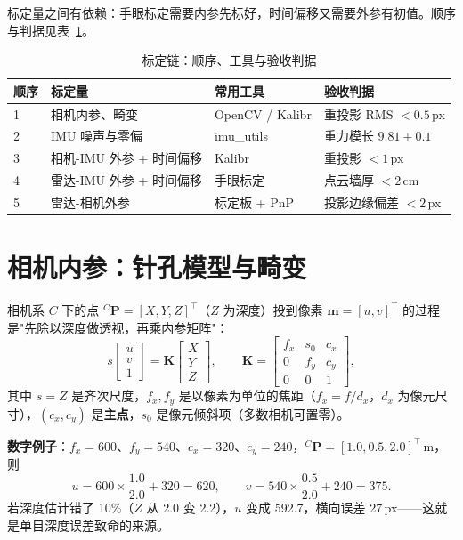 标定量之间有依赖：手眼标定需要内参先标好，时间偏移又需要外参有初值。顺序与判据见表~\ref{tab:26-chain}。

\begin{table}[htbp]
  \centering
  \caption{标定链：顺序、工具与验收判据}\label{tab:26-chain}
  \small
  \begin{tabular}{lllp{4.6cm}}
    \toprule
    顺序 & 标定量 & 常用工具 & 验收判据 \\
    \midrule
    1 & 相机内参、畸变 & OpenCV / Kalibr & 重投影 RMS $<0.5$\,px \\
    2 & IMU 噪声与零偏 & imu\_utils & 重力模长 $9.81\pm0.1$ \\
    3 & 相机-IMU 外参 + 时间偏移 & Kalibr & 重投影 $<1$\,px \\
    4 & 雷达-IMU 外参 + 时间偏移 & 手眼标定 & 点云墙厚 $<2$\,cm \\
    5 & 雷达-相机外参 & 标定板 + PnP & 投影边缘偏差 $<2$\,px \\
    \bottomrule
  \end{tabular}
\end{table}

\section{相机内参：针孔模型与畸变}\label{sec:26-pinhole}

相机系 $C$ 下的点 ${}^{C}\bm{P}=[X,Y,Z]^{\top}$（$Z$ 为深度）投到像素 $\bm{m}=[u,v]^{\top}$ 的过程是"先除以深度做透视，再乘内参矩阵"：
\begin{equation}
s\begin{bmatrix}u\\v\\1\end{bmatrix}=\bm{K}\begin{bmatrix}X\\Y\\Z\end{bmatrix},
\qquad
\bm{K}=\begin{bmatrix}f_x & s_0 & c_x\\ 0 & f_y & c_y\\ 0&0&1\end{bmatrix},
\label{eq:26-project}
\end{equation}
其中 $s=Z$ 是齐次尺度，$f_x,f_y$ 是以像素为单位的焦距（$f_x=f/d_x$，$d_x$ 为像元尺寸），$(c_x,c_y)$ 是\textbf{主点}，$s_0$ 是像元倾斜项（多数相机可置零）。

\textbf{数字例子}：$f_x=600$、$f_y=540$、$c_x=320$、$c_y=240$，${}^{C}\bm{P}=[1.0,0.5,2.0]^{\top}$\,m，则
\begin{equation}
u=600\times\frac{1.0}{2.0}+320=620,\qquad v=540\times\frac{0.5}{2.0}+240=375.
\end{equation}
若深度估计错了 10\%（$Z$ 从 2.0 变 2.2），$u$ 变成 592.7，横向误差 27\,px——这就是单目深度误差致命的来源。

